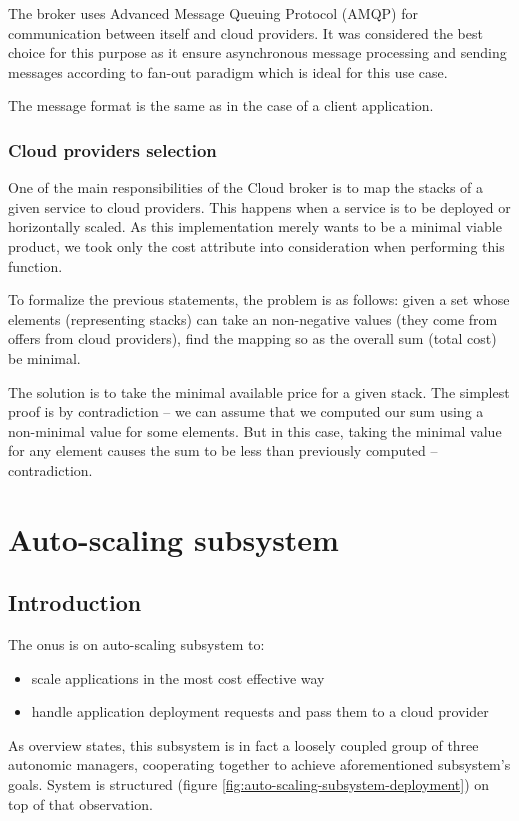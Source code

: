 The broker uses Advanced Message Queuing Protocol (AMQP) for communication between itself and cloud providers. It was considered the best choice for this purpose as it ensure asynchronous message processing and sending messages according to fan-out paradigm which is ideal for this use case.

The message format is the same as in the case of a client application.

\subsubsection{Cloud providers selection}
One of the main responsibilities of the Cloud broker is to map the stacks of a given service to cloud providers. This happens when a service is to be deployed or horizontally scaled. As this implementation merely wants to be a minimal viable product, we took only the cost attribute into consideration when performing this function.

To formalize the previous statements, the problem is as follows: given a set whose elements (representing stacks) can take an non-negative values (they come from offers from cloud providers), find the mapping so as the overall sum (total cost) be minimal.

The solution is to take the minimal available price for a given stack. The simplest proof is by contradiction -- we can assume that we computed our sum using a non-minimal value for some elements. But in this case, taking the minimal value for any element causes the sum to be less than previously computed -- contradiction.

\section{Auto-scaling subsystem}

\subsection{Introduction}
The onus is on auto-scaling subsystem to:
\begin{itemize}
 \item scale applications in the most cost effective way
 \item handle application deployment requests and pass them to a cloud provider 
\end{itemize}

As overview states, this subsystem is in fact a loosely coupled group of three autonomic managers, cooperating together to achieve aforementioned subsystem's goals. System is structured (figure \ref{fig:auto-scaling-subsystem-deployment}) on top of that observation.

